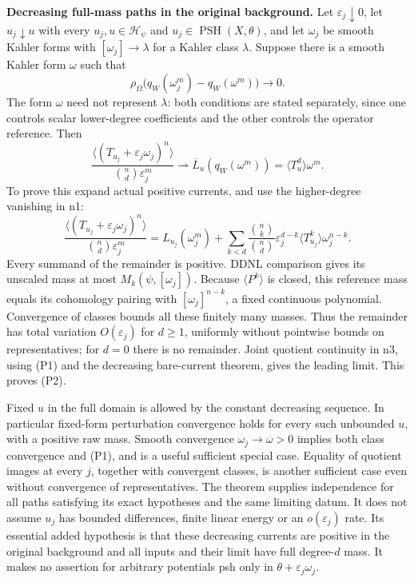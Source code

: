 \documentclass[
  11pt,
]{article}
\begin{document}
\textbf{Decreasing full-mass paths in the original background.} Let
\(\varepsilon_j\downarrow0\), let \(u_j\downarrow u\) with every
\(u_j,u\in\mathcal H_\psi\) and \(u_j\in\operatorname{PSH}(X,\theta)\),
and let \(\omega_j\) be smooth Kahler forms with
\([\omega_j]\to\lambda\) for a Kahler class \(\lambda\). Suppose there
is a smooth Kahler form \(\omega\) such that \[
\rho_\Omega\big(q_W(\omega_j^m)-q_W(\omega^m)\big)\longrightarrow0. \tag{P1}
\] The form \(\omega\) need not represent \(\lambda\): both conditions
are stated separately, since one controls scalar lower-degree
coefficients and the other controls the operator reference. Then \[
\frac{\langle(T_{u_j}+\varepsilon_j\omega_j)^n\rangle}
{\binom nd\varepsilon_j^m}
\rightharpoonup\overline L_u(q_W(\omega^m))=\langle T_u^d\rangle\omega^m. \tag{P2}
\] To prove this expand actual positive currents, and use the
higher-degree vanishing in n1: \[
\frac{\langle(T_{u_j}+\varepsilon_j\omega_j)^n\rangle}
{\binom nd\varepsilon_j^m}
=L_{u_j}(\omega_j^m)+
\sum_{k<d}\frac{\binom nk}{\binom nd}\varepsilon_j^{d-k}
\langle T_{u_j}^k\rangle\omega_j^{n-k}. \tag{P3}
\] Every summand of the remainder is positive. DDNL comparison gives its
unscaled mass at most \(M_k(\psi,[\omega_j])\). Because
\(\langle P^k\rangle\) is closed, this reference mass equals its
cohomology pairing with \([\omega_j]^{n-k}\), a fixed continuous
polynomial. Convergence of classes bounds all these finitely many
masses. Thus the remainder has total variation \(O(\varepsilon_j)\) for
\(d\geq1\), uniformly without pointwise bounds on representatives; for
\(d=0\) there is no remainder. Joint quotient continuity in n3, using
(P1) and the decreasing bare-current theorem, gives the leading limit.
This proves (P2).

Fixed \(u\) in the full domain is allowed by the constant decreasing
sequence. In particular fixed-form perturbation convergence holds for
every such unbounded \(u\), with a positive raw mass. Smooth convergence
\(\omega_j\to\omega>0\) implies both class convergence and (P1), and is
a useful sufficient special case. Equality of quotient images at every
\(j\), together with convergent classes, is another sufficient case even
without convergence of representatives. The theorem supplies
independence for all paths satisfying its exact hypotheses and the same
limiting datum. It does not assume \(u_j\) has bounded differences,
finite linear energy or an \(o(\varepsilon_j)\) rate. Its essential
added hypothesis is that these decreasing currents are positive in the
original background and all inputs and their limit have full
degree-\(d\) mass. It makes no assertion for arbitrary potentials psh
only in \(\theta+\varepsilon_j\omega_j\).
\end{document}
